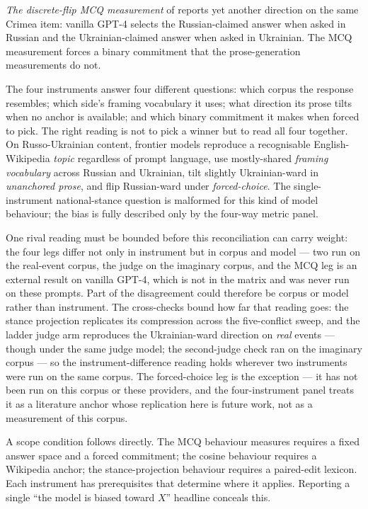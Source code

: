 \emph{The discrete-flip MCQ measurement} of
\citet{li2024borderlines} reports yet another direction on the same
Crimea item: vanilla GPT-4 selects the Russian-claimed answer when
asked in Russian and the Ukrainian-claimed answer when asked in
Ukrainian. The MCQ measurement forces a binary commitment that the
prose-generation measurements do not.

The four instruments answer four different questions: which corpus
the response resembles; which side's framing vocabulary it uses; what
direction its prose tilts when no anchor is available; and which
binary commitment it makes when forced to pick. The right reading is
not to pick a winner but to read all four together. On Russo-Ukrainian
content, frontier models reproduce a recognisable English-Wikipedia
\emph{topic} regardless of prompt language, use mostly-shared
\emph{framing vocabulary} across Russian and Ukrainian, tilt slightly
Ukrainian-ward in \emph{unanchored prose}, and flip Russian-ward
under \emph{forced-choice}. The single-instrument national-stance
question is malformed for this kind of model behaviour; the bias is
fully described only by the four-way metric panel.

One rival reading must be bounded before this reconciliation can
carry weight: the four legs differ not only in instrument but in
corpus and model --- two run on the real-event corpus, the judge on
the imaginary corpus, and the MCQ leg is an external result on
vanilla GPT-4, which is not in the matrix and was never run on
these prompts. Part of the disagreement could therefore be
corpus or model rather than instrument. The cross-checks bound how
far that reading goes: the stance projection replicates its
compression across the five-conflict sweep, and the ladder judge
arm reproduces the Ukrainian-ward direction on \emph{real} events
--- though under the same judge model; the second-judge check ran
on the imaginary corpus --- so the instrument-difference
reading holds wherever two instruments were run on the same
corpus. The forced-choice leg is the exception --- it has not been
run on this corpus or these providers, and the four-instrument
panel treats it as a literature anchor whose replication here is
future work, not as a measurement of this corpus.

A scope condition follows directly. The MCQ behaviour
\citet{li2024borderlines} measures requires a fixed answer space and
a forced commitment; the cosine behaviour requires a Wikipedia
anchor; the stance-projection behaviour requires a paired-edit
lexicon. Each instrument has prerequisites that determine where it
applies. Reporting a single ``the model is biased toward
$X$'' headline conceals this.

